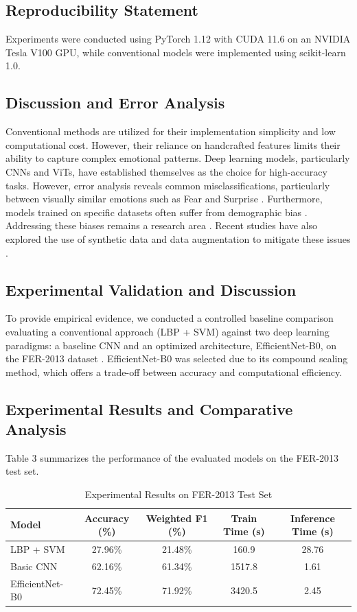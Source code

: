 \documentclass[pdflatex,sn-basic]{sn-jnl}
\theoremstyle{thmstyleone}
\theoremstyle{thmstyletwo}
\theoremstyle{thmstylethree}
\begin{document}
\subsection{Reproducibility Statement}
Experiments were conducted using PyTorch 1.12 with CUDA 11.6 on an NVIDIA Tesla V100 GPU, while conventional models were implemented using scikit-learn 1.0.

\subsection{Discussion and Error Analysis}

Conventional methods are utilized for their implementation simplicity and low computational cost. However, their reliance on handcrafted features limits their ability to capture complex emotional patterns. Deep learning models, particularly CNNs and ViTs, have established themselves as the choice for high-accuracy tasks. However, error analysis reveals common misclassifications, particularly between visually similar emotions such as Fear and Surprise \cite{ref15}. Furthermore, models trained on specific datasets often suffer from demographic bias \cite{ref14, ref20}. Addressing these biases remains a research area \cite{ref21, ref22}. Recent studies have also explored the use of synthetic data and data augmentation to mitigate these issues \cite{ref23, ref24, ref25}.

\subsection{Experimental Validation and Discussion}

To provide empirical evidence, we conducted a controlled baseline comparison evaluating a conventional approach (LBP + SVM) against two deep learning paradigms: a baseline CNN and an optimized architecture, EfficientNet-B0, on the FER-2013 dataset \cite{ref9}. EfficientNet-B0 \cite{tan2019efficientnet} was selected due to its compound scaling method, which offers a trade-off between accuracy and computational efficiency.

\subsection{Experimental Results and Comparative Analysis}

Table 3 summarizes the performance of the evaluated models on the FER-2013 test set.

\begin{table}[htbp]
\centering
\caption{Experimental Results on FER-2013 Test Set}\label{tab:results}
\begin{tabularx}{\linewidth}{@{}l c c c c@{}}
\toprule
Model & Accuracy (\%) & Weighted F1 (\%) & Train Time (s) & Inference Time (s)\\
\midrule
LBP + SVM & 27.96\% & 21.48\% & 160.9 & 28.76\\
Basic CNN & 62.16\% & 61.34\% & 1517.8 & 1.61\\
EfficientNet-B0 & 72.45\% & 71.92\% & 3420.5 & 2.45\\
\bottomrule
\end{tabularx}
\end{table}
\end{document}
